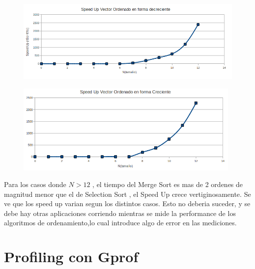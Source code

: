 \begin{figure}[!htp]
\begin{center}
\includegraphics[width=12cm]{Imagenes/SpeedUpVectorOrdenadoEnFormaDecreciente.png}
\end{center}
\end{figure} 


\begin{figure}[!htp]
\begin{center}
\includegraphics[width=11cm]{Imagenes/SpeedUpVectorOrdenadoEnFormaCreciente.png}
\end{center}
\end{figure} 

\newpage

Para los casos donde $N>12$ , el tiempo del Merge Sort es mas de 2 ordenes de magnitud menor que el de Selection Sort , el Speed Up crece vertiginosamente.
Se ve que los speed up varian segun los distintos casos. Esto no deberia suceder, y se debe hay otras aplicaciones corriendo mientras
se mide la performance de los algoritmos de ordenamiento,lo cual introduce algo de error en las mediciones.

\newpage

\section{Profiling con Gprof}

